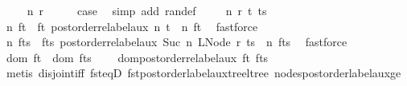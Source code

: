 \begin{isabellebody}
\ \ \isamarkupfalse%
\ {\isacharparenleft}{\kern0pt}{}\ n\ r{\isacharparenright}{\kern0pt}\isanewline
\ \ \isamarkupfalse%
\ \isamarkupfalse%
\ {\isacharquery}{\kern0pt}case\ \isamarkupfalse%
\ {\isacharparenleft}{\kern0pt}simp\ add{\isacharcolon}{\kern0pt}\ ran{\isacharunderscore}{\kern0pt}def{\isacharparenright}{\kern0pt}\isanewline
{}\isamarkupfalse%
\isanewline
\ \ \isamarkupfalse%
\ {\isacharparenleft}{\kern0pt}{}\ n\ r\ t\ ts{\isacharparenright}{\kern0pt}\isanewline
\ \ \isamarkupfalse%
\ n{\isacharprime}{\kern0pt}\ f{\isacharunderscore}{\kern0pt}t\ \ f{\isacharunderscore}{\kern0pt}t{\isacharcolon}{\kern0pt}\ {\isachardoublequoteopen}postorder{\isacharunderscore}{\kern0pt}relabel{\isacharunderscore}{\kern0pt}aux\ n\ t\ {\isacharequal}{\kern0pt}\ {\isacharparenleft}{\kern0pt}n{\isacharprime}{\kern0pt}{\isacharcomma}{\kern0pt}\ f{\isacharunderscore}{\kern0pt}t{\isacharparenright}{\kern0pt}{\isachardoublequoteclose}\ \isamarkupfalse%
\ fastforce\isanewline
\ \ \isamarkupfalse%
\ n{\isacharprime}{\kern0pt}{\isacharprime}{\kern0pt}\ f{\isacharunderscore}{\kern0pt}ts\ \ f{\isacharunderscore}{\kern0pt}ts{\isacharcolon}{\kern0pt}\ {\isachardoublequoteopen}postorder{\isacharunderscore}{\kern0pt}relabel{\isacharunderscore}{\kern0pt}aux\ {\isacharparenleft}{\kern0pt}Suc\ n{\isacharprime}{\kern0pt}{\isacharparenright}{\kern0pt}\ {\isacharparenleft}{\kern0pt}LNode\ r\ ts{\isacharparenright}{\kern0pt}\ {\isacharequal}{\kern0pt}\ {\isacharparenleft}{\kern0pt}n{\isacharprime}{\kern0pt}{\isacharprime}{\kern0pt}{\isacharcomma}{\kern0pt}\ f{\isacharunderscore}{\kern0pt}ts{\isacharparenright}{\kern0pt}{\isachardoublequoteclose}\ \isamarkupfalse%
\ fastforce\isanewline
\ \ \isamarkupfalse%
\ {\isachardoublequoteopen}dom\ f{\isacharunderscore}{\kern0pt}t\ {\isasyminter}\ dom\ f{\isacharunderscore}{\kern0pt}ts\ {\isacharequal}{\kern0pt}\ {\isacharbraceleft}{\kern0pt}{\isacharbraceright}{\kern0pt}{\isachardoublequoteclose}\ \isamarkupfalse%
\ dom{\isacharunderscore}{\kern0pt}postorder{\isacharunderscore}{\kern0pt}relabel{\isacharunderscore}{\kern0pt}aux\ f{\isacharunderscore}{\kern0pt}t\ f{\isacharunderscore}{\kern0pt}ts\isanewline
\ \ \ \ \isamarkupfalse%
\ {\isacharparenleft}{\kern0pt}metis\ disjoint{\isacharunderscore}{\kern0pt}iff\ fst{\isacharunderscore}{\kern0pt}eqD\ fst{\isacharunderscore}{\kern0pt}postorder{\isacharunderscore}{\kern0pt}label{\isacharunderscore}{\kern0pt}aux{\isacharunderscore}{\kern0pt}tree{\isacharunderscore}{\kern0pt}ltree\ nodes{\isacharunderscore}{\kern0pt}postorder{\isacharunderscore}{\kern0pt}label{\isacharunderscore}{\kern0pt}aux{\isacharunderscore}{\kern0pt}ge\isanewline

\end{isabellebody}
